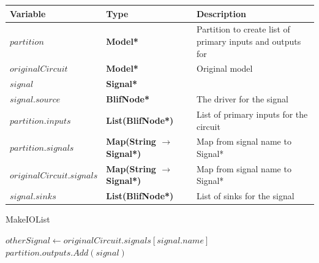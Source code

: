 \documentclass[12pt,final,oneside]{dwThesis} %
\begin{document}
   \begin{algorithm}

      \begin{center}

         \begin{tabularx}
            {\linewidth}{llX} \toprule
            Variable & Type & Description\\
            \midrule $partition$ &\textbf{
               Model* } &  Partition to create list of primary inputs and
            outputs for\\
            $originalCircuit$ &\textbf{  Model* } &  Original
            model \\
            $signal$ &\textbf{  Signal* } &  \\
            $signal.source$
            &\textbf{  BlifNode* } &  The driver for the signal \\

            $partition.inputs$ &\textbf{  List(BlifNode*) } &  List of primary
            inputs for the circuit \\
            $partition.signals$ &\textbf{  Map(String
               $\to$ Signal*) } &  Map from signal name to Signal* \\

            $originalCircuit.signals$ &\textbf{  Map(String $\to$ Signal*) } &
            Map from signal name to Signal* \\
            $signal.sinks$ &\textbf{
               List(BlifNode*) } &  List of sinks for the signal \\


            \bottomrule 
         \end{tabularx}

      \end{center}

      \caption{MakeIOList}\label{makeiolist} 
      \begin{algorithmic}
         [1]
             
         \EndIf 
         \State $otherSignal \gets originalCircuit.signals[signal.name]$
         \State $partition.outputs.Add(signal)$
         \EndIf \EndFor \EndProcedure 
      \end{algorithmic}

   \end{algorithm}
\end{document}
